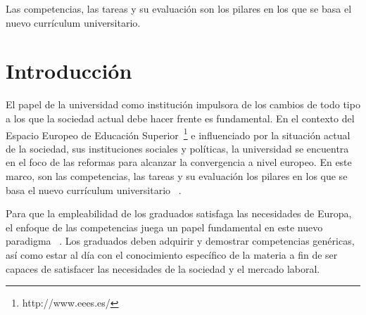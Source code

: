 



\begin{savequote}[50mm]
Las competencias, las tareas y su evaluación son los pilares en los que se basa el nuevo currículum universitario. 
\end{savequote}

\chapter{Introducción}
\label{cha:Introduction}

\ifpdf
    \graphicspath{{1_introduction/figures/PNG/}{1_introduction/figures/PDF/}{1_introduction/figures/}}
\else
    \graphicspath{{1_introduction/figures/EPS/}{1_introduction/figures/}}
\fi



El papel de la universidad como institución impulsora de los cambios de todo tipo a los que la sociedad actual debe hacer frente es fundamental. En el contexto del Espacio Europeo de Educación Superior~\footnote{http://www.eees.es/} e influenciado por la situación actual de  la sociedad, sus instituciones sociales y políticas, la universidad se encuentra en el foco de las reformas para alcanzar la convergencia a nivel europeo. En este marco, son las competencias, las tareas y su evaluación los pilares en los que se basa el nuevo currículum universitario ~\cite{zabala2005espacio}.

Para que la empleabilidad de los graduados satisfaga las necesidades de Europa, el enfoque de las competencias juega un papel fundamental en este nuevo paradigma  ~\cite{communique2012making}. Los graduados deben adquirir y demostrar competencias genéricas, así como estar al día con el conocimiento específico de la materia a fin de ser capaces de satisfacer las necesidades de la sociedad y el mercado laboral.


